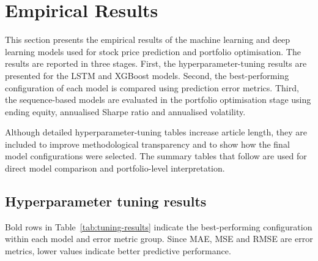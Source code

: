 \section{Empirical Results}

This section presents the empirical results of the machine learning and deep learning models used for stock price prediction and portfolio optimisation. The results are reported in three stages. First, the hyperparameter-tuning results are presented for the LSTM and XGBoost models. Second, the best-performing configuration of each model is compared using prediction error metrics. Third, the sequence-based models are evaluated in the portfolio optimisation stage using ending equity, annualised Sharpe ratio and annualised volatility.

Although detailed hyperparameter-tuning tables increase article length, they are included to improve methodological transparency and to show how the final model configurations were selected. The summary tables that follow are used for direct model comparison and portfolio-level interpretation.

\subsection{Hyperparameter tuning results}

Bold rows in Table~\ref{tab:tuning-results} indicate the best-performing configuration within each model and error metric group. Since MAE, MSE and RMSE are error metrics, lower values indicate better predictive performance.

